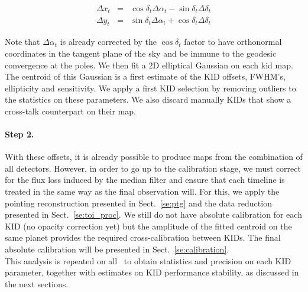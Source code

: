\begin{eqnarray}
\Delta x_t &=& \cos\delta_t \Delta\alpha_t - \sin \delta_t\Delta \delta_t \nonumber \\
\Delta y_t &=& \sin\delta_t \Delta\alpha_t + \cos \delta_t\Delta \delta_t \nonumber
\end{eqnarray}

Note that $\Delta\alpha_t$ is already corrected by the $\cos\delta_t$ factor to
have orthonormal coordinates in the tangent plane of the sky and be immune to
the geodesic convergence at the poles. We then fit a 2D elliptical Gaussian on
each kid map. The centroid of this Gaussian is a first estimate of the KID
offsets, FWHM's, ellipticity and sensitivity. We apply a first KID selection by
removing outliers to the statistics on these parameters. We also discard
manually KIDs that show a cross-talk counterpart on their map.

\paragraph{Step 2.} With these offsets, it is already possible to produce maps
from the combination of all detectors. However, in order to go up to
the calibration stage, we must correct for the flux loss induced by
the median filter and ensure that each timeline is treated in the same
way as the final observation will. For this, we apply the pointing
reconstruction presented in Sect.~\ref{se:ptg} and the data reduction
presented in Sect.~\ref{se:toi_proc}. We still do not have absolute
calibration for each KID (no opacity correction yet) but the amplitude
of the fitted centroid on the same planet provides the required
cross-calibration between KIDs. The final absolute calibration will be
presented in Sect.~\ref{se:calibration}.\\

This analysis is repeated on all \bms\ to obtain statistics and
precision on each KID parameter, together with estimates on KID
performance stability, as discussed in the next sections.


